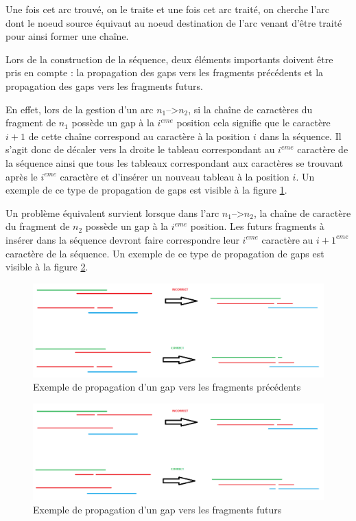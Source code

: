\documentclass[12pt,a4paper,final]{article}
\begin{document}
Une fois cet arc trouvé, on le traite et une fois cet arc traité, on cherche l'arc dont le noeud source équivaut au noeud destination de l'arc venant d'être traité pour ainsi former une chaîne.\medskip

Lors de la construction de la séquence, deux éléments importants doivent être pris en compte : la propagation des gaps vers les fragments précédents et la propagation des gaps vers les fragments futurs.\medskip

En effet, lors de la gestion d'un arc $n_1$-->$n_2$, si la chaîne de caractères du fragment de $n_1$ possède un gap à la $i^{eme}$ position cela signifie que le caractère $i+1$ de cette chaîne correspond au caractère à la position $i$ dans la séquence.  Il s'agit donc de décaler vers la droite le tableau correspondant au $i^{eme}$ caractère de la séquence ainsi que tous les tableaux correspondant aux caractères se trouvant après le $i^{eme}$ caractère et d'insérer un nouveau tableau à la position $i$.  Un exemple de ce type de propagation de gaps est visible à la figure \ref{gapPrecedent}.\medskip

Un problème équivalent survient lorsque dans l'arc $n_1$-->$n_2$, la chaîne de caractère du fragment de $n_2$ possède un gap à la $i^{eme}$ position.  Les futurs fragments à insérer dans la séquence devront faire correspondre leur $i^{eme}$ caractère au $i+1^{eme}$ caractère de la séquence.  Un exemple de ce type de propagation de gaps est visible à la figure \ref{gapSuivant}.\medskip

\begin{figure}[!ht]
\centering
	\includegraphics[width=1\textwidth]{images/gapPrecedent.png}
	\caption{\label{gapPrecedent}Exemple de propagation d'un gap vers les fragments précédents}
\end{figure}

\begin{figure}[!ht]
\centering
	\includegraphics[width=1\textwidth]{images/gapSuivant.png}
	\caption{\label{gapSuivant}Exemple de propagation d'un gap vers les fragments futurs}
\end{figure}
\end{document}
